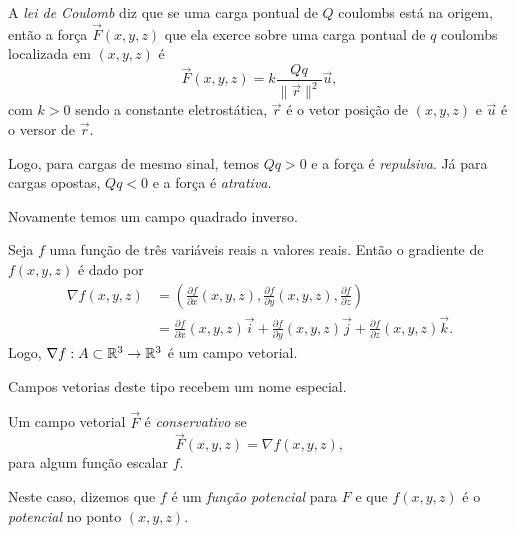 \begin{example}
    A \textit{lei de Coulomb} diz que se uma carga pontual de \(Q\) coulombs está na origem, então a força \(\overrightarrow{F}(x,y,z)\) que ela exerce sobre uma carga pontual de \(q\) coulombs localizada em \((x,y,z)\) é \[\overrightarrow{F}(x,y,z) = k \frac{Qq}{\|\overrightarrow{r}\|^2} \overrightarrow{u},\] com \(k>0\) sendo a constante eletrostática, \(\overrightarrow{r}\) é o vetor posição de \((x,y,z)\) e \(\overrightarrow{u}\) é o versor de \(\overrightarrow{r}\).

    Logo, para cargas de mesmo sinal, temos \(Qq > 0\) e a força é \textit{repulsiva}. Já para cargas opostas, \(Qq<0\) e a força é \textit{atrativa}.

    Novamente temos um campo quadrado inverso.
\end{example}

Seja \(f\) uma função de três variáveis reais a valores reais. Então o gradiente de \(f(x,y,z)\) é dado por
    \begin{align*}
        \nabla f(x,y,z) 
        & = \left( \frac{\partial f}{\partial x}(x,y,z), \frac{\partial f}{\partial y}(x,y,z), \frac{\partial f}{\partial z} \right) \\
        & = \frac{\partial f}{\partial x}(x,y,z)\overrightarrow{i} + \frac{\partial f}{\partial y}(x,y,z)\overrightarrow{j} + \frac{\partial f}{\partial z}(x,y,z)\overrightarrow{k}.
    \end{align*}
Logo, \(\nabla f: A\subset\mathbb{R}^3 \to \mathbb{R}^3\) é um campo vetorial.

Campos vetorias deste tipo recebem um nome especial.

\begin{definition}
    Um campo vetorial \(\overrightarrow{F}\) é \textit{conservativo} se \[\overrightarrow{F}(x,y,z) = \nabla f(x,y,z),\] para algum função escalar \(f\).

    Neste caso, dizemos que \(f\) é um \textit{função potencial} para \(F\) e que \(f(x,y,z)\) é o \textit{potencial} no ponto \((x,y,z)\).
\end{definition}

